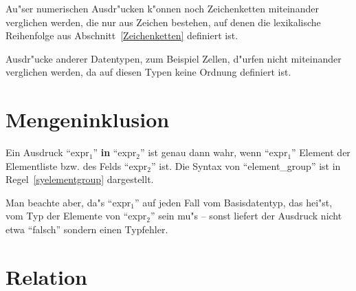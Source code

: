 Au"ser numerischen Ausdr"ucken k"onnen noch
Zeichenketten miteinander verglichen
werden, die nur aus Zeichen bestehen, auf denen die
lexikalische Reihenfolge aus Abschnitt~\ref{Zeichenketten} definiert
ist.

Ausdr"ucke anderer Datentypen, zum Beispiel Zellen, d"urfen nicht
miteinander verglichen werden, da auf diesen Typen keine Ordnung
definiert ist. 





\section{Mengeninklusion}



\begin{center}
\end{center}

Ein Ausdruck ``expr$_{1}$'' {\bf in} ``expr$_{2}$'' ist
genau dann wahr, wenn ``expr$_{1}$'' Element der Elementliste bzw. des
Felds ``expr$_{2}$'' ist. Die Syntax von ``element\_group'' ist in
Regel~\ref{syelementgroup} dargestellt.

Man beachte aber, da"s ``expr$_{1}$'' auf jeden Fall vom
Basisdatentyp, das hei"st, vom Typ der Elemente von ``expr$_{2}$''
sein mu"s -- sonst liefert der Ausdruck nicht etwa ``falsch'' sondern
einen Typfehler.  


\section{Relation}


\begin{center}
\end{center}

